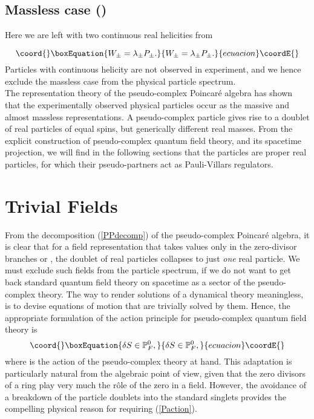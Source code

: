 \documentclass[a4paper,aps,prd,showkeys,showpacs,superscriptaddress,preprint]{revtex4}
\providecommand{\pc}{\mathbb{P}}
\begin{document}
\subsection{Massless case (\coordHE{})}
Here we are left with two continuous real helicities \myHighlight{$\lambda_\pm$}\coordHE{} from

\begin{equation}\coord{}\boxEquation{
  W_\pm = \lambda_\pm P_\pm.
}{
  W_\pm = \lambda_\pm P_\pm.
}{ecuacion}\coordE{}\end{equation}
Particles with continuous helicity are not observed in experiment, and we hence
exclude the massless case from the physical particle spectrum.\\

The representation theory of the pseudo-complex Poincar\'e algebra has
shown that the experimentally observed physical particles occur as the massive and almost
massless representations. A pseudo-complex particle gives rise to a
doublet of real particles of equal spins, but generically different
real masses. From the explicit construction of pseudo-complex quantum
field theory, and its spacetime projection, we will find in the
following sections that the \myHighlight{$\left|+\right>$}\coordHE{} particles are proper real
particles, for which their \myHighlight{$\left|-\right>$}\coordHE{} pseudo-partners act as
Pauli-Villars regulators.

\section{Trivial Fields\label{sec_AP}}
From the decomposition (\ref{PPdecomp}) of the pseudo-complex
Poincar\'e algebra, it is clear that for a
field representation \myHighlight{$\phi$}\coordHE{} that takes values only in the zero-divisor
branches \myHighlight{${\pc_{F}}_+^0$}\coordHE{} or
\myHighlight{${\pc_{F}}_-^0$}\coordHE{}, the doublet
of real particles collapses to just \textsl{one} real particle. We
must exclude such fields from the particle spectrum, if we do not want
to get back standard quantum field theory on spacetime as a sector of
the pseudo-complex theory. The way to render solutions of a dynamical
theory meaningless, is to devise equations of motion that are
trivially solved by them. Hence, the appropriate formulation of the
action principle for pseudo-complex quantum field theory is
\begin{equation}\coord{}\boxEquation{\label{Paction}
  \delta S \in \pc_F^0,
}{\delta S \in \pc_F^0,
}{ecuacion}\coordE{}\end{equation} 
where \coordHE{} is the action of the pseudo-complex theory at hand. 
This adaptation is particularly natural from the algebraic point of view, given
that the zero divisors of a ring play very much the r\^ole of the zero
in a field. However, the avoidance of a breakdown of the particle
doublets into the standard singlets provides the compelling physical
reason for requiring (\ref{Paction}).
\end{document}
